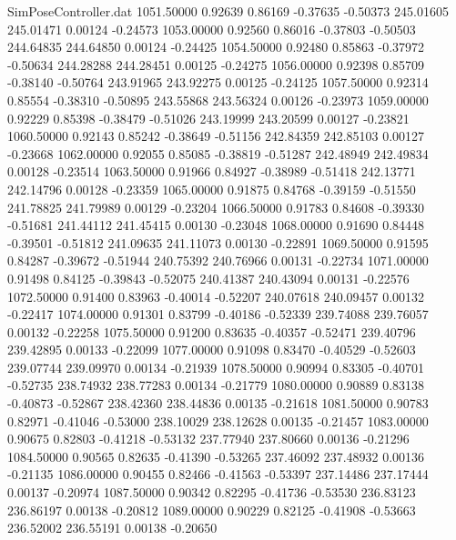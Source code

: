 \begin{filecontents}{SimPoseController.dat}
1051.50000    0.92639    0.86169    -0.37635   -0.50373  245.01605  245.01471    0.00124   -0.24573
1053.00000    0.92560    0.86016    -0.37803   -0.50503  244.64835  244.64850    0.00124   -0.24425
1054.50000    0.92480    0.85863    -0.37972   -0.50634  244.28288  244.28451    0.00125   -0.24275
1056.00000    0.92398    0.85709    -0.38140   -0.50764  243.91965  243.92275    0.00125   -0.24125
1057.50000    0.92314    0.85554    -0.38310   -0.50895  243.55868  243.56324    0.00126   -0.23973
1059.00000    0.92229    0.85398    -0.38479   -0.51026  243.19999  243.20599    0.00127   -0.23821
1060.50000    0.92143    0.85242    -0.38649   -0.51156  242.84359  242.85103    0.00127   -0.23668
1062.00000    0.92055    0.85085    -0.38819   -0.51287  242.48949  242.49834    0.00128   -0.23514
1063.50000    0.91966    0.84927    -0.38989   -0.51418  242.13771  242.14796    0.00128   -0.23359
1065.00000    0.91875    0.84768    -0.39159   -0.51550  241.78825  241.79989    0.00129   -0.23204
1066.50000    0.91783    0.84608    -0.39330   -0.51681  241.44112  241.45415    0.00130   -0.23048
1068.00000    0.91690    0.84448    -0.39501   -0.51812  241.09635  241.11073    0.00130   -0.22891
1069.50000    0.91595    0.84287    -0.39672   -0.51944  240.75392  240.76966    0.00131   -0.22734
1071.00000    0.91498    0.84125    -0.39843   -0.52075  240.41387  240.43094    0.00131   -0.22576
1072.50000    0.91400    0.83963    -0.40014   -0.52207  240.07618  240.09457    0.00132   -0.22417
1074.00000    0.91301    0.83799    -0.40186   -0.52339  239.74088  239.76057    0.00132   -0.22258
1075.50000    0.91200    0.83635    -0.40357   -0.52471  239.40796  239.42895    0.00133   -0.22099
1077.00000    0.91098    0.83470    -0.40529   -0.52603  239.07744  239.09970    0.00134   -0.21939
1078.50000    0.90994    0.83305    -0.40701   -0.52735  238.74932  238.77283    0.00134   -0.21779
1080.00000    0.90889    0.83138    -0.40873   -0.52867  238.42360  238.44836    0.00135   -0.21618
1081.50000    0.90783    0.82971    -0.41046   -0.53000  238.10029  238.12628    0.00135   -0.21457
1083.00000    0.90675    0.82803    -0.41218   -0.53132  237.77940  237.80660    0.00136   -0.21296
1084.50000    0.90565    0.82635    -0.41390   -0.53265  237.46092  237.48932    0.00136   -0.21135
1086.00000    0.90455    0.82466    -0.41563   -0.53397  237.14486  237.17444    0.00137   -0.20974
1087.50000    0.90342    0.82295    -0.41736   -0.53530  236.83123  236.86197    0.00138   -0.20812
1089.00000    0.90229    0.82125    -0.41908   -0.53663  236.52002  236.55191    0.00138   -0.20650

\end{filecontents}
